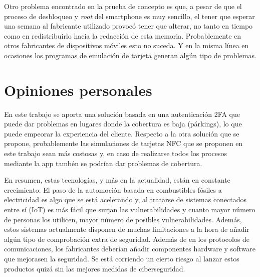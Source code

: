 \documentclass[12pt,a4paper,onecolumn,oneside]{report}
\begin{document}
Otro problema encontrado en la prueba de concepto es que, a pesar de que el proceso de desbloqueo y \textit{root} del smartphone es muy sencillo, el tener que esperar una semana al fabricante utilizado provocó tener que alterar, no tanto en tiempo como en redistribuirlo hacia la redacción de esta memoria. Probablemente en otros fabricantes de dispositivos móviles esto no suceda. Y en la misma línea en ocasiones los programas de emulación de tarjeta generan algún tipo de problemas.


\section*{Opiniones personales}

En este trabajo se aporta una solución basada en una autenticación 2FA que puede dar problemas en lugares donde la cobertura es baja (párkings), lo que puede empeorar la experiencia del cliente. Respecto a la otra solución que se propone, probablemente las simulaciones de tarjetas NFC que se proponen en este trabajo sean más costosas y, en caso de realizarse todos los procesos mediante la app tambén se podrían dar problemas de cobertura.

En resumen, estas tecnologías, y más en la actualidad, están en constante crecimiento. El paso de la automoción basada en combustibles fósiles a electricidad es algo que se está acelerando y, al tratarse de sistemas conectados entre sí (IoT) es más fácil que surjan las vulnerabilidades y cuanto mayor número de personas los utilicen, mayor número de posibles vulnerabilidades. Además, estos sistemas actualmente disponen de muchas limitaciones a la hora de añadir algún tipo de comprobación extra de seguridad. Además de en los protocolos de comunicaciones, los fabricantes deberían añadir componentes hardware y software que mejorasen la seguridad. Se está corriendo un cierto riesgo al lanzar estos productos quizá sin las mejores medidas de ciberseguridad.



\renewcommand\bibname{Lista de referencias}

\end{document}
